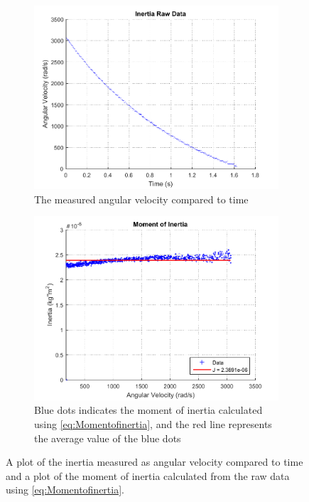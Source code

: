 \begin{figure}[H]
  \setcounter{subfigure}{0}
  \centering
  \begin{subfigure}{0.45\textwidth}
    \centering
    \includegraphics[width=1.1\linewidth]{figures/inertiaRawData.pdf}
    \caption{The measured angular velocity compared to time}
    \label{inertiaRawData}
  \end{subfigure}
  \begin{subfigure}{0.45\textwidth}
    \centering
    \includegraphics[width=1.1\linewidth]{figures/momentOfInertia.pdf}
    \caption{Blue dots indicates the moment of inertia calculated using \eqref{eq:Momentofinertia}, and the red line represents the average value of the blue dots}
  	\label{momentOfInertia}
  \end{subfigure}
  \caption{A plot of the inertia measured as angular velocity compared to time and a plot of the moment of inertia calculated from the raw data using \eqref{eq:Momentofinertia}.}
  \label{yo}
\end{figure}


